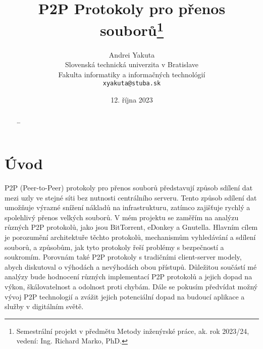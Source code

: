 \documentclass[10pt,twoside,czech,a4paper]{article}
\title{P2P Protokoly pro přenos souborů\thanks{Semestrální projekt v předmětu Metody inženýrské práce, ak. rok 2023/24, vedení: Ing. Richard Marko, PhD.}}
\author{Andrei Yakuta\\[2pt]
	{\small Slovenská technická univerzita v Bratislave}\\
	{\small Fakulta informatiky a informačných technológií}\\
	{\small \texttt{xyakuta@stuba.sk}}
	}
\date{\small 12. října 2023}
\begin{document}
\maketitle

\begin{abstract}
\ldots
\end{abstract}



\section{Úvod}

P2P (Peer-to-Peer) protokoly pro přenos souborů představují způsob sdílení dat mezi uzly ve stejné síti bez nutnosti centrálního serveru.
Tento způsob sdílení dat umožňuje výrazné snížení nákladů na infrastrukturu, zatímco zajišťuje rychlý a spolehlivý přenos velkých souborů.
V mém projektu se zaměřím na analýzu různých P2P protokolů, jako jsou BitTorrent, eDonkey a Gnutella.
Hlavním cílem je porozumění architektuře těchto protokolů, mechanismům vyhledávání a sdílení souborů, a způsobům, jak tyto protokoly řeší problémy s bezpečností a soukromím.
Porovnám také P2P protokoly s tradičními client-server modely, abych diskutoval o výhodách a nevýhodách obou přístupů.
Důležitou součástí mé analýzy bude hodnocení různých implementací P2P protokolů a jejich dopad na výkon, škálovatelnost a odolnost proti chybám.
Dále se pokusím předvídat možný vývoj P2P technologií a zvážit jejich potenciální dopad na budoucí aplikace a služby v digitálním světě.



\end{document}
